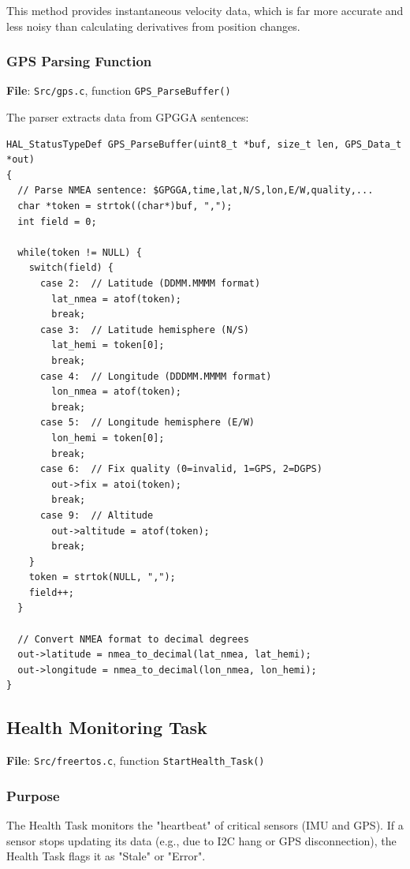 \documentclass[11pt,a4paper]{article}
\begin{document}
This method provides instantaneous velocity data, which is far more accurate and less noisy than calculating derivatives from position changes.

\subsubsection{GPS Parsing Function}
\textbf{File}: \texttt{Src/gps.c}, function \texttt{GPS\_ParseBuffer()}

The parser extracts data from GPGGA sentences:

\begin{lstlisting}[caption=GPS NMEA Field Extraction, label=lst:gpsfields]
HAL_StatusTypeDef GPS_ParseBuffer(uint8_t *buf, size_t len, GPS_Data_t *out)
{
  // Parse NMEA sentence: $GPGGA,time,lat,N/S,lon,E/W,quality,...
  char *token = strtok((char*)buf, ",");
  int field = 0;
  
  while(token != NULL) {
    switch(field) {
      case 2:  // Latitude (DDMM.MMMM format)
        lat_nmea = atof(token);
        break;
      case 3:  // Latitude hemisphere (N/S)
        lat_hemi = token[0];
        break;
      case 4:  // Longitude (DDDMM.MMMM format)
        lon_nmea = atof(token);
        break;
      case 5:  // Longitude hemisphere (E/W)
        lon_hemi = token[0];
        break;
      case 6:  // Fix quality (0=invalid, 1=GPS, 2=DGPS)
        out->fix = atoi(token);
        break;
      case 9:  // Altitude
        out->altitude = atof(token);
        break;
    }
    token = strtok(NULL, ",");
    field++;
  }
  
  // Convert NMEA format to decimal degrees
  out->latitude = nmea_to_decimal(lat_nmea, lat_hemi);
  out->longitude = nmea_to_decimal(lon_nmea, lon_hemi);
}
\end{lstlisting}


\subsection{Health Monitoring Task}
\textbf{File}: \texttt{Src/freertos.c}, function \texttt{StartHealth\_Task()}

\subsubsection{Purpose}
The Health Task monitors the "heartbeat" of critical sensors (IMU and GPS). If a sensor stops updating its data (e.g., due to I2C hang or GPS disconnection), the Health Task flags it as "Stale" or "Error".
\end{document}
